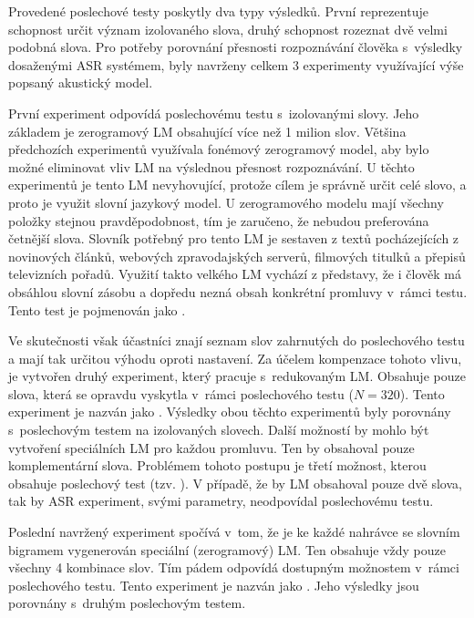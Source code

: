 Provedené poslechové testy poskytly dva typy výsledků.
První reprezentuje schopnost určit význam izolovaného slova, druhý schopnost rozeznat dvě velmi podobná slova.
Pro potřeby porovnání přesnosti rozpoznávání člověka s~výsledky dosaženými ASR systémem, byly navrženy celkem $3$ experimenty využívající výše popsaný akustický model.

První experiment odpovídá poslechovému testu s~izolovanými slovy.
Jeho základem je zerogramový LM obsahující více než 1 milion slov.
Většina předchozích experimentů využívala fonémový zerogramový model, aby bylo možné eliminovat vliv LM na výslednou přesnost rozpoznávání.
U těchto experimentů je tento LM nevyhovující, protože cílem je správně určit celé slovo, a proto je využit slovní jazykový model.
U zerogramového modelu mají všechny položky stejnou pravděpodobnost, tím je zaručeno, že nebudou preferována četnější slova.
Slovník potřebný pro tento LM je sestaven z textů pocházejících z novinových článků, webových zpravodajských serverů, filmových titulků a přepisů televizních pořadů.
Využití takto velkého LM vychází z představy, že i člověk má obsáhlou slovní zásobu a dopředu nezná obsah konkrétní promluvy v~rámci testu.
Tento test je pojmenován jako .

Ve skutečnosti však účastníci znají seznam slov zahrnutých do poslechového testu a mají tak určitou výhodu oproti  nastavení.
Za účelem kompenzace tohoto vlivu, je vytvořen druhý experiment, který pracuje s~redukovaným LM.
Obsahuje pouze slova, která se opravdu vyskytla v~rámci poslechového testu ($N = 320$).
Tento experiment je nazván jako .
Výsledky obou těchto experimentů byly porovnány s~poslechovým testem na izolovaných slovech.
Další možností by mohlo být vytvoření speciálních LM pro každou promluvu.
Ten by obsahoval pouze komplementární slova.
Problémem tohoto postupu je třetí možnost, kterou obsahuje poslechový test (tzv. ).
V případě, že by LM obsahoval pouze dvě slova, tak by ASR experiment, svými parametry, neodpovídal poslechovému testu.

Poslední navržený experiment spočívá v~tom, že je ke každé nahrávce se slovním bigramem vygenerován speciální (zerogramový) LM.
Ten obsahuje vždy pouze všechny 4 kombinace slov.
Tím pádem odpovídá dostupným možnostem v~rámci poslechového testu.
Tento experiment je nazván jako .
Jeho výsledky jsou porovnány s~druhým poslechovým testem.

